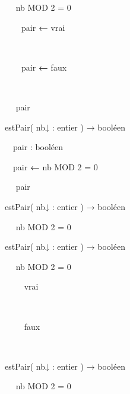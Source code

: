 {{\sffamily
\ \  nb MOD 2 = 0 }

{\sffamily
\ \ \ \ pair
{\textbf{←}}{ vrai}}

{\sffamily
\ \ }

{\sffamily
\ \ \ \ pair
{\textbf{←}}{ faux}}

{\sffamily
\ \  }

{\sffamily
\ \  pair}

{\sffamily
{}}


\bigskip

{\sffamily
{} estPair( nb{↓ :} entier
) {→} booléen}

{\sffamily
\ \ pair : booléen}

{\sffamily
\ \ pair {\textbf{←}}{
nb }{MOD}{ 2 = 0}}

{\sffamily
\ \  pair}

{\sffamily
{}}


\bigskip

{\sffamily
{} estPair( nb{↓ :} entier
) {→} booléen}

{\sffamily
\ \  nb MOD 2 = 0}

{\sffamily
{}}


\bigskip


\bigskip

{\sffamily
{} estPair( nb{↓ :} entier
) {→} booléen}

{\sffamily
\ \  nb MOD 2 = 0 }

{\sffamily
\ \ \ \ 
{vrai}}

{\sffamily
\ \ }

{\sffamily
\ \ \ \ 
{faux}}

{\sffamily
\ \  }

{\sffamily
{}}


\bigskip

{\sffamily
{} estPair( nb{↓ :} entier
) {→} booléen}

{\sffamily
\ \  nb MOD 2 = 0 }

{\sffamily
\ \ \ \ }

}
